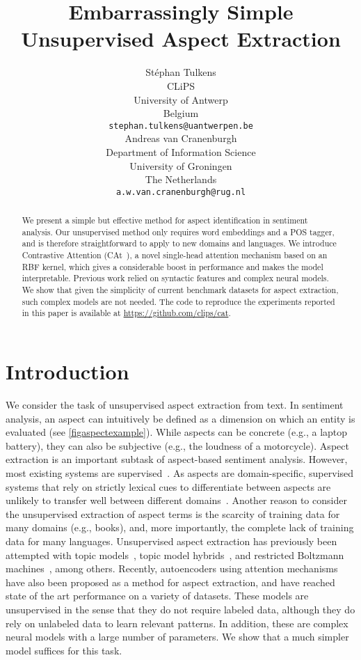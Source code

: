 \documentclass[11pt,a4paper]{article}
\title{Embarrassingly Simple Unsupervised Aspect Extraction}
\author{St\'ephan Tulkens\\
  CLiPS \\
  University of Antwerp \\
  Belgium \\
  \texttt{\normalsize stephan.tulkens@uantwerpen.be} \\\And
  Andreas van Cranenburgh \\
  Department of Information Science \\
  University of Groningen \\
  The Netherlands \\
  \texttt{\normalsize a.w.van.cranenburgh@rug.nl} \\}
\date{}
\newlength{\catheight}
\newcommand{\ourmodel}{CAt~\raisebox{-0.1ex}{\texttt{[image: fig/cat]}}} \definecolor{aspectcolor}{HTML}{fb7e5e}
\begin{document}
\maketitle
\begin{abstract}
We present a simple but effective method for aspect identification
in sentiment analysis.
Our unsupervised method only requires word embeddings and a POS tagger,
and is therefore straightforward to apply to new domains and languages.
We introduce Contrastive Attention (\ourmodel), a novel single-head attention mechanism based on an RBF kernel, which gives a considerable boost in performance and makes the model interpretable.
Previous work relied on syntactic features and complex neural models.
We show that given the simplicity of current benchmark datasets
for aspect extraction, such complex models are not needed.
The code to reproduce the experiments reported in this paper
is available at \url{https://github.com/clips/cat}.
\end{abstract}


\section{Introduction}

We consider the task of unsupervised aspect extraction from text.
In sentiment analysis, an aspect can intuitively be defined as
a dimension on which an entity is evaluated (see \autoref{figaspectexample}).
While aspects can be concrete (e.g., a laptop battery), they can also be subjective (e.g., the loudness of a motorcycle).
Aspect extraction is an important subtask
of aspect-based sentiment analysis.
However, most existing systems are supervised~\citep[for an overview, cf.~][]{zhang2018deep}.
As aspects are domain-specific, supervised systems that rely on strictly lexical cues to differentiate between aspects are unlikely to transfer well between different domains~\citep{rietzler2019adapt}.
Another reason to consider the unsupervised extraction of aspect terms is the scarcity of training data for many domains (e.g., books), and, more importantly, the complete lack of training data for many languages.
Unsupervised aspect extraction has previously been attempted with topic models~\citep{mukherjee2012aspect}, topic model hybrids~\citep{garcia2018w2vlda}, and restricted Boltzmann machines~\citep{wang2015sentiment}, among others.
Recently, autoencoders using attention mechanisms~\citep{he2017unsupervised,luo2019unsupervised} have also been proposed as a method for aspect extraction, and have reached state of the art performance on a variety of datasets.
These models are unsupervised in the sense that they do not require labeled data, although they do rely on unlabeled data to learn relevant patterns.
In addition, these are complex neural models with a large number of parameters. We show that a much simpler model suffices for this task.
\end{document}
